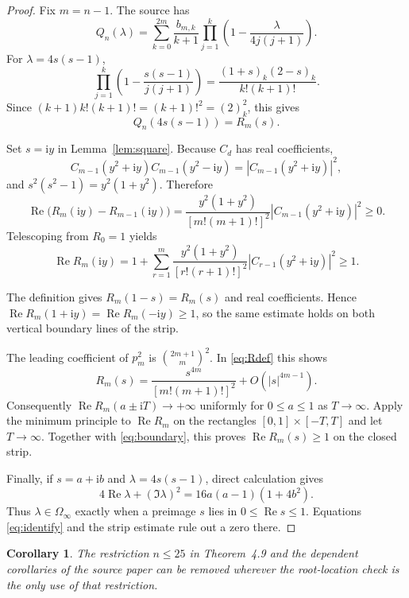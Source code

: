 \documentclass[11pt]{article}
\newtheorem{corollary}{Corollary}
\newcommand{\Om}{\Omega_\infty}
\newcommand{\Ree}{\operatorname{Re}}
\newcommand{\ii}{\mathrm i}
\begin{document}
\begin{proof}
Fix $m=n-1$.  The source has
\[
 Q_n(\lambda)=\sum_{k=0}^{2m}\frac{b_{m,k}}{k+1}
 \prod_{j=1}^k\left(1-\frac{\lambda}{4j(j+1)}\right).
\]
For $\lambda=4s(s-1)$,
\[
 \prod_{j=1}^k\left(1-\frac{s(s-1)}{j(j+1)}\right)
 =\frac{(1+s)_k(2-s)_k}{k!(k+1)!}.
\]
Since $(k+1)k!(k+1)!=(k+1)!^2=(2)_k^2$, this gives
\begin{equation}\label{eq:identify}
 Q_n(4s(s-1))=R_m(s).
\end{equation}

Set $s=\ii y$ in Lemma~\ref{lem:square}.  Because $C_d$ has real coefficients,
\[
 C_{m-1}(y^2+\ii y)C_{m-1}(y^2-\ii y)
 =\left|C_{m-1}(y^2+\ii y)\right|^2,
\]
and $s^2(s^2-1)=y^2(1+y^2)$.  Therefore
\begin{equation}\label{eq:increment}
 \Ree\bigl(R_m(\ii y)-R_{m-1}(\ii y)\bigr)
 =\frac{y^2(1+y^2)}{[m!(m+1)!]^2}
 \left|C_{m-1}(y^2+\ii y)\right|^2\ge0.
\end{equation}
Telescoping from $R_0=1$ yields
\begin{equation}\label{eq:boundary}
 \Ree R_m(\ii y)
 =1+\sum_{r=1}^m\frac{y^2(1+y^2)}{[r!(r+1)!]^2}
 \left|C_{r-1}(y^2+\ii y)\right|^2\ge1.
\end{equation}

The definition gives $R_m(1-s)=R_m(s)$ and real coefficients.  Hence
$\Ree R_m(1+\ii y)=\Ree R_m(-\ii y)\ge1$, so the same estimate holds on both vertical boundary lines of the strip.

The leading coefficient of $p_m^2$ is
$\binom{2m+1}{m}^2$.  In \eqref{eq:Rdef} this shows
\[
 R_m(s)=\frac{s^{4m}}{[m!(m+1)!]^2}+O(|s|^{4m-1}).
\]
Consequently $\Ree R_m(a\pm\ii T)\to+\infty$ uniformly for $0\le a\le1$ as $T\to\infty$.  Apply the minimum principle to $\Ree R_m$ on the rectangles
$[0,1]\times[-T,T]$ and let $T\to\infty$.  Together with
\eqref{eq:boundary}, this proves $\Ree R_m(s)\ge1$ on the closed strip.

Finally, if $s=a+\ii b$ and $\lambda=4s(s-1)$, direct calculation gives
\begin{equation}\label{eq:parabola}
 4\Ree\lambda+(\Im\lambda)^2
 =16a(a-1)(1+4b^2).
\end{equation}
Thus $\lambda\in\Om$ exactly when a preimage $s$ lies in
$0\le\Ree s\le1$.  Equations \eqref{eq:identify} and the strip estimate rule out a zero there.
\end{proof}

\begin{corollary}
The restriction $n\le25$ in Theorem~4.9 and the dependent corollaries of the source paper can be removed wherever the root-location check is the only use of that restriction.
\end{corollary}
\end{document}

